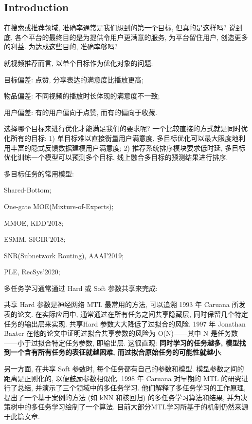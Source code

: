 \subsection{Introduction}
在搜索或推荐领域, 准确率通常是我们想到的第一个目标, 但真的是这样吗? 说到底, 各个平台的最终目的是为提供令用户更满意的服务, 为平台留住用户, 创造更多的利益. 为达成这些目的, 准确率够吗?

就视频推荐而言, 以单个目标作为优化对象的问题:
\begin{myitemize}
	\item 目标偏差: 点赞, 分享表达的满意度比播放更高;
	
	\item 物品偏差: 不同视频的播放时长体现的满意度不一致;
	
	\item 用户偏差: 有的用户偏向于点赞, 而有的偏向于收藏.
\end{myitemize}

选择哪个目标来进行优化才能满足我们的要求呢? 一个比较直接的方式就是同时优化所有的目标: 1) 单目标难以直接衡量用户满意度, 多目标优化可以最大限度地利用丰富的隐式反馈数据建模用户满意度; 2) 推荐系统排序模块要求低时延, 多目标优化训练一个模型可以预测多个目标, 线上融合多目标的预测结果进行排序.


多目标任务的常用模型: 
\begin{myitemize}
	\item Shared-Bottom;
	\item One-gate MOE(Mixture-of-Experts);
	\item MMOE, KDD'2018;
	\item ESMM, SIGIR'2018;
	\item SNR(Subnetwork Routing), AAAI'2019;
	\item PLE, RecSys'2020;
\end{myitemize}

多任务学习通常通过 Hard 或 Soft 参数共享来完成: 
\begin{myitemize}
	\item 共享 Hard 参数是神经网络 MTL 最常用的方法, 可以追溯 1993 年 Caruana 所发表的论文. 在实际应用中, 通常通过在所有任务之间共享隐藏层, 同时保留几个特定任务的输出层来实现. 共享Hard 参数大大降低了过拟合的风险. 1997 年 Jonathan Baxter 在他的论文中证明过拟合共享参数的风险为 O(N)——其中 N 是任务数——小于过拟合特定任务参数, 即输出层. 这很直观: \textbf{同时学习的任务越多, 模型找到一个含有所有任务的表征就越困难, 而过拟合原始任务的可能性就越小};
	
	\item 另一方面, 在共享 Soft 参数时, 每个任务都有自己的参数和模型. 模型参数之间的距离是正则化的, 以便鼓励参数相似化. 1998 年 Caruana 对早期的 MTL 的研究进行了总结, 并演示了三个领域中的多任务学习. 他们解释了多任务学习的工作原理, 提出了一个基于案例的方法 (如 kNN 和核回归) 的多任务学习算法和结果, 并为决策树中的多任务学习绘制了一个算法. 目前大部分MTL学习所基于的机制仍然来源于此篇文章.
\end{myitemize}
 

